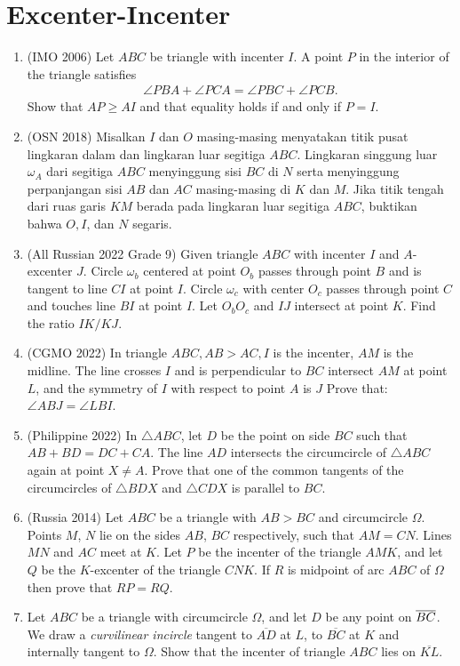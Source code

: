 \documentclass[11pt]{scrartcl}
\begin{document}
\section{Excenter-Incenter}
\begin{enumerate}
\item (IMO 2006) Let $ABC$ be triangle with incenter $I$. A point $P$ in the interior of the triangle satisfies
\begin{align*}
    \angle PBA + \angle PCA = \angle PBC + \angle PCB.
\end{align*}
Show that $AP \ge AI$ and that equality holds if and only if $P=I$.

\item (OSN 2018) Misalkan $I$ dan $O$ masing-masing menyatakan titik pusat lingkaran dalam dan lingkaran luar segitiga $ABC$. Lingkaran singgung luar $\omega_A$ dari segitiga $ABC$ menyinggung sisi $BC$ di $N$ serta menyinggung perpanjangan sisi $AB$ dan $AC$ masing-masing di $K$ dan $M$. Jika titik tengah dari ruas garis $KM$ berada pada lingkaran luar segitiga $ABC$, buktikan bahwa $O,I$, dan $N$ segaris.

\item (All Russian 2022 Grade 9) Given triangle $ABC$ with incenter $I$ and $A$-excenter $J$. Circle $\omega_b$ centered at point $O_b$ passes through point $B$ and is tangent to line $CI$ at point $I$. Circle $\omega_c$ with center $O_c$ passes through point $C$ and touches line $BI$ at point $I$. Let $O_bO_c$ and $IJ$ intersect at point $K$. Find the ratio $IK/KJ$.

\item (CGMO 2022) In triangle $ABC,AB>AC,I$ is the incenter, $AM$ is the midline. The line crosses $I$ and is perpendicular to $BC $ intersect $AM$ at point $L$, and the symmetry of $I$ with respect to point $A$ is $J$
Prove that: $\angle ABJ= \angle LBI$.

\item (Philippine 2022) In $\triangle ABC$, let $D$ be the point on side $BC$ such that $AB+BD=DC+CA.$ The line $AD$ intersects the circumcircle of $\triangle ABC$ again at point $X \neq A$. Prove that one of the common tangents of the circumcircles of $\triangle BDX$ and $\triangle CDX$ is parallel to $BC$.

\item 	(Russia 2014) Let $ABC$ be a triangle with $AB>BC$ and circumcircle $\Omega$. Points $M$, $N$ lie on the sides $AB$, $BC$ respectively, such that $AM=CN$. Lines $MN$ and $AC$ meet at $K$. Let $P$ be the incenter of the triangle $AMK$, and let $Q$ be the $K$-excenter of the triangle $CNK$. If $R$ is midpoint of arc $ABC$ of $\Omega$ then prove that $RP=RQ$.

\item Let $ABC$ be a triangle with circumcircle $\Omega$, and let $D$ be any point on $\overline{BC}$. We draw a \emph{curvilinear incircle} tangent to $\overline{AD}$ at $L$, to $\overline{BC}$ at $K$ and internally tangent to $\Omega$. Show that the incenter of triangle $ABC$ lies on $\overline{KL}$.
\end{enumerate}
\end{document}

